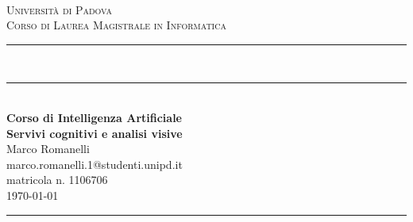 \documentclass[fleqn,a4paper,11pt]{article}
\newcommand\HRule{\rule{\textwidth}{1pt}}
\newcommand\DRule{\rule{\textwidth}{.4pt}\\[\dimexpr-\baselineskip+1mm+2pt] \rule{\textwidth}{2pt}}
\begin{document}
\begin{titlepage}
\begin{center}
	\begin{minipage}{6in}
  		\centering
  		\hspace*{1.6in}
	\end{minipage}\\[1cm]
\textsc{\LARGE Universit\`a di Padova}\\[.2cm]
\textsc{\large Corso di Laurea Magistrale in Informatica}\\[.3cm]
\DRule \\[.5cm]
{\Large \bfseries Corso di Intelligenza Artificiale} \\[.4cm]
{\huge \bfseries Servivi cognitivi e analisi visive} \\[.4cm]
{\Large Marco Romanelli} \\[.2cm]
{\footnotesize marco.romanelli.1@studenti.unipd.it} \\
{\footnotesize matricola n. 1106706} \\[1cm]
{\large \today}
\HRule \\[3cm]
\end{center}
\end{titlepage}
\newpage


 

 

 















%
\end{document}
